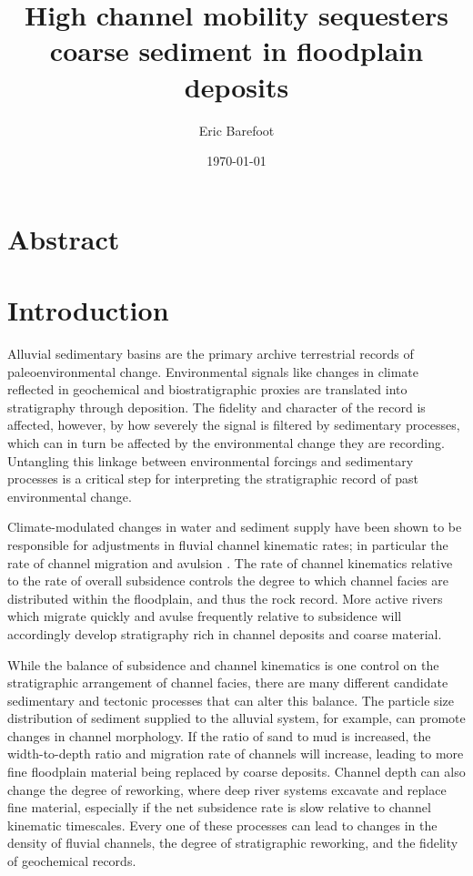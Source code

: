 \documentclass[draft]{compact_proposal}
\title{High channel mobility sequesters coarse sediment in floodplain deposits}
\author{Eric Barefoot}
\date{\today}
\begin{document}
\maketitle


\section{Abstract}

\section{Introduction}

Alluvial sedimentary basins are the primary archive  terrestrial records of paleoenvironmental change.
Environmental signals like changes in climate reflected in geochemical and biostratigraphic proxies are translated into stratigraphy through  deposition.
The fidelity and character of the record is affected, however, by how severely the signal is filtered by sedimentary processes, which can in turn be affected by the environmental change they are recording.
Untangling this linkage between environmental forcings and sedimentary processes is a critical step for interpreting the stratigraphic record of past environmental change.

Climate-modulated changes in water and sediment supply have been shown to be responsible for adjustments in fluvial channel kinematic rates; in particular the rate of channel migration and avulsion .
The rate of channel kinematics relative to the rate of overall subsidence controls the degree to which channel facies are distributed within the floodplain, and thus the rock record.
More active rivers which migrate quickly and avulse frequently relative to subsidence will accordingly develop stratigraphy rich in channel deposits and coarse material.

While the balance of subsidence and channel kinematics is one control on the stratigraphic arrangement of channel facies, there are many different candidate sedimentary and tectonic processes that can alter this balance.
The particle size distribution of sediment supplied to the alluvial system, for example, can promote changes in channel morphology.
If the ratio of sand to mud is increased, the width-to-depth ratio and migration rate of channels will increase, leading to more fine floodplain material being replaced by coarse deposits.
Channel depth can also change the degree of reworking, where deep river systems excavate and replace fine material, especially if the net subsidence rate is slow relative to channel kinematic timescales.
Every one of these processes can lead to changes in the density of fluvial channels, the degree of stratigraphic reworking, and the fidelity of geochemical records.
\end{document}
